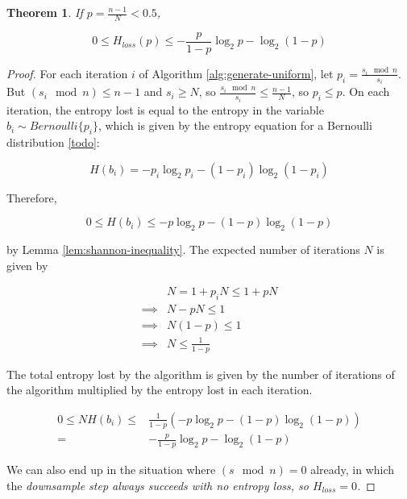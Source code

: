 \documentclass[12pt]{article}
\newtheorem{theorem}{Theorem}
\begin{document}
\begin{theorem}
    \label{thm:loss}
If $p = \frac{n-1}{N} < 0.5$,

\begin{equation}
0 \le H_{loss}(p) \le -\frac{p}{1-p}\log_2p - \log_2(1-p)
\end{equation}

\end{theorem}

\begin{proof}
For each iteration $i$ of Algorithm \ref{alg:generate-uniform}, let $p_i = \frac{s_i \mod n}{s_i}$. But $(s_i \mod n) \le n-1$ and $s_i \ge N$, so $\frac{s_i \mod n}{s_i} \le \frac{n-1}{N}$, so $p_i \le p$. On each iteration, the entropy lost is equal to the entropy in the variable $b_i \sim Bernoulli\{p_i\}$, which is given by the entropy equation for a Bernoulli distribution \ref{todo}:

\begin{equation}
H(b_i) = -p_i\log_2p_i - (1-p_i)\log_2(1-p_i)
\end{equation}

Therefore, 

\begin{equation}
0 \le H(b_i) \le -p\log_2p - (1-p)\log_2(1-p) 
\end{equation}


by Lemma \ref{lem:shannon-inequality}. The expected number of iterations $N$ is given by

\begin{align}
& N = 1 + p_iN \le 1 + pN \\
\implies & N-pN \le 1 \\
\implies & N(1-p) \le 1 \\
\implies & N \le \frac{1}{1-p}
\end{align}

The total entropy lost by the algorithm is given by the number of iterations of the algorithm multiplied by the entropy lost in each iteration.

\begin{align}
0 \le NH(b_i) \le & \frac{1}{1-p}(-p\log_2p - (1-p)\log_2(1-p) ) \\
= & -\frac{p}{1-p}\log_2p - \log_2(1-p)
\end{align}

We can also end up in the situation where $(s \mod n) = 0$ already, in which the \em downsample \em step always succeeds with no entropy loss, so $H_{loss}=0$.
\end{proof}
\end{document}
